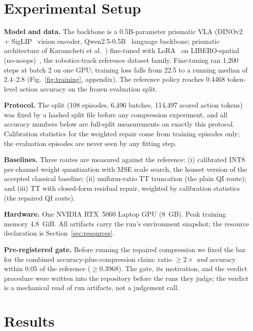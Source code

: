 \documentclass[conference,10pt]{IEEEtran}
\begin{document}
\section{Experimental Setup}

\textbf{Model and data.} The backbone is a 0.5B-parameter prismatic VLA
(DINOv2~\cite{oquab23} + SigLIP~\cite{zhai23} vision encoder,
Qwen2.5-0.5B~\cite{yang24} language backbone; prismatic architecture of
Karamcheti et al.~\cite{karamcheti24}) fine-tuned
with LoRA~\cite{hu22} on LIBERO-spatial (no-noops)~\cite{liu23libero}, the robotics-track reference
dataset family. Fine-tuning ran 1{,}200 steps at batch 2 on one GPU; training
loss falls from 22.5 to a running median of 2.4--2.8
(Fig.~\ref{fig:training}, appendix). The reference policy reaches
0.4468 token-level action accuracy on the frozen evaluation split.

\textbf{Protocol.} The split (108 episodes, 6{,}496 batches, 114{,}497 scored
action tokens) was fixed by a hashed split file before any compression
experiment, and all accuracy numbers below are full-split measurements on
exactly this protocol. Calibration statistics for the weighted repair come
from training episodes only; the evaluation episodes are never seen by any
fitting step.

\textbf{Baselines.} Three routes are measured against the reference:
(i) calibrated INT8 per-channel weight quantization with MSE scale search,
the honest version of the accepted classical baseline; (ii) uniform-ratio TT
truncation (the plain QI route); and (iii) TT with closed-form residual
repair, weighted by calibration statistics (the repaired QI route).

\textbf{Hardware.} One NVIDIA RTX~5060 Laptop GPU (8~GB). Peak training
memory 4.8~GiB. All artifacts carry the run's environment snapshot; the
resource declaration is Section~\ref{sec:resources}.

\textbf{Pre-registered gate.} Before running the repaired compression we
fixed the bar for the combined accuracy-plus-compression claim: ratio
$\ge 2\times$ \emph{and} accuracy within $0.05$ of the reference
($\ge 0.3968$). The gate, its motivation, and the verdict procedure were
written into the repository before the runs they judge; the verdict is a
mechanical read of run artifacts, not a judgement call.

\section{Results}
\label{sec:results}
\end{document}
